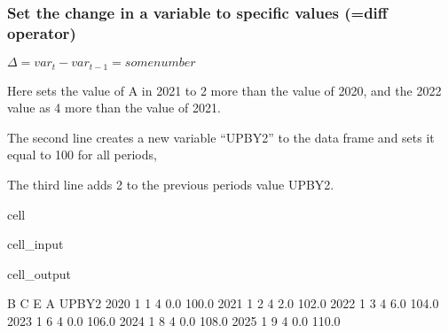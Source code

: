 \documentclass[letterpaper,10pt,english]{jupyterBook}
\begin{document}
\subsubsection{Set the change in a variable to specific values (=diff operator)}
\label{\detokenize{content/04_PythonEssentials/UpdateCommand:set-the-change-in-a-variable-to-specific-values-diff-operator}}
\sphinxAtStartPar
\(\Delta = var_t - var_{t-1} = some number\)

\sphinxAtStartPar
Here sets the value of A in 2021 to 2 more than the value of 2020, and the 2022 value as 4 more than the  value of 2021.

\sphinxAtStartPar
The second line creates a new variable “UPBY2” to the data frame and sets it equal to 100 for all periods,

\sphinxAtStartPar
The third line adds 2 to the previous periods value UPBY2.

\begin{sphinxuseclass}{cell}\begin{sphinxVerbatimInput}

\begin{sphinxuseclass}{cell_input}
\begin{sphinxVerbatim}[commandchars=\\\{\}]

\end{sphinxVerbatim}

\end{sphinxuseclass}\end{sphinxVerbatimInput}
\begin{sphinxVerbatimOutput}

\begin{sphinxuseclass}{cell_output}
\begin{sphinxVerbatim}[commandchars=\\\{\}]
      B  C  E    A  UPBY2
2020  1  1  4  0.0  100.0
2021  1  2  4  2.0  102.0
2022  1  3  4  6.0  104.0
2023  1  6  4  0.0  106.0
2024  1  8  4  0.0  108.0
2025  1  9  4  0.0  110.0
\end{sphinxVerbatim}

\end{sphinxuseclass}\end{sphinxVerbatimOutput}

\end{sphinxuseclass}
\end{document}
